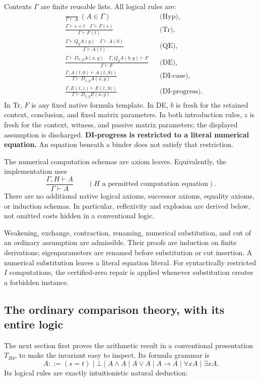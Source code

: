 Contexts $\Gamma$ are finite reusable lists. All logical rules are:
\begin{align*}
 &\frac{}{\Gamma\vdash A}\ (A\in\Gamma) &&\text{(Hyp)},\\[4pt]
 &\frac{\Gamma\vdash s=t\quad\Gamma\vdash F(s)}
        {\Gamma\vdash F(t)} &&\text{(Tr)},\\[4pt]
 &\frac{\Gamma\vdash Q_yA(y)\quad\Gamma\vdash A(0)}
        {\Gamma\vdash A(t)} &&\text{(QE)},\\[4pt]
 &\frac{\Gamma\vdash D_{x,y}A(x,y)\quad
         \Gamma,Q_yA(b,y)\vdash F}
        {\Gamma\vdash F} &&\text{(DE)},\\[4pt]
 &\frac{\Gamma,A(t,0)\vdash A(t,Sz)}
        {\Gamma\vdash D_{x,y}A(x,y)} &&\text{(DI-case)},\\[4pt]
 &\frac{\Gamma,E(t,z)\vdash E(t,Sz)}
        {\Gamma\vdash D_{x,y}E(x,y)} &&\text{(DI-progress)}.
\end{align*}
In Tr, $F$ is any fixed native formula template. In DE, $b$ is fresh for
the retained context, conclusion, and fixed matrix parameters. In both
introduction rules, $z$ is fresh for the context, witness, and passive
matrix parameters; the displayed assumption is discharged.
\textbf{DI-progress is restricted to a literal numerical equation.}
An equation beneath a binder does not satisfy that restriction.

The numerical computation schemas are axiom leaves. Equivalently, the
implementation uses
\[
 \frac{\Gamma,H\vdash A}{\Gamma\vdash A}
 \qquad(H\text{ a permitted computation equation}).\tag{Supply}
\]
There are no additional native logical axioms, successor axioms, equality
axioms, or induction schemas. In particular, reflexivity and explosion
are derived below, not omitted costs hidden in a conventional logic.

Weakening, exchange, contraction, renaming, numerical substitution, and
cut of an ordinary assumption are admissible. Their proofs are induction
on finite derivations; eigenparameters are renamed before substitution
or cut insertion. A numerical substitution leaves a literal equation
literal. For syntactically restricted $I$ computations, the certified-zero
repair is applied whenever substitution creates a forbidden instance.

\subsection{The ordinary comparison theory, with its entire logic}
The next section first proves the arithmetic result in a conventional
presentation $T_{Bd}$, to make the invariant easy to inspect. Its
formula grammar is
\[
 A::=(s=t)\mid\bot\mid A\land A\mid A\lor A\mid A\to A
          \mid\forall xA\mid\exists xA.
\]
Its logical rules are exactly intuitionistic natural deduction:

